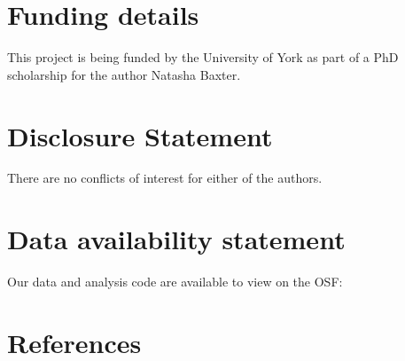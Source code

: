 \documentclass[
]{article}
\begin{document}
\hypertarget{funding-details}{%
\section*{Funding details}\label{funding-details}}

This project is being funded by the University of York as part of a PhD scholarship for the author Natasha Baxter.

\hypertarget{disclosure-statement}{%
\section*{Disclosure Statement}\label{disclosure-statement}}

There are no conflicts of interest for either of the authors.

\hypertarget{data-availability-statement}{%
\section*{Data availability statement}\label{data-availability-statement}}

Our data and analysis code are available to view on the OSF:

\hypertarget{references}{%
\section*{References}\label{references}}
\end{document}
